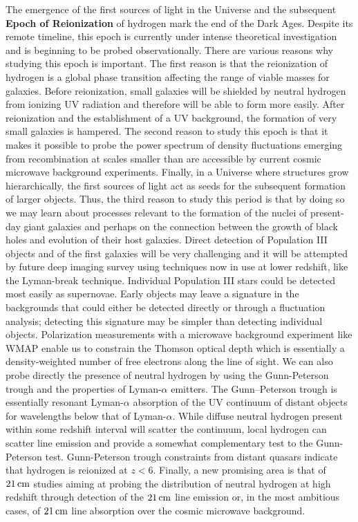 \documentclass[a4paper,11pt]{article}
\begin{document}
The emergence of the first sources of light in the Universe and the subsequent \textbf{Epoch of Reionization} of hydrogen mark the end of the Dark Ages. Despite its remote timeline, this epoch is currently under intense theoretical investigation and is beginning to be probed observationally. There are various reasons why studying this epoch is important. The first reason is that the reionization of hydrogen is a global phase transition affecting the range of viable masses for galaxies. Before reionization, small galaxies will be shielded by neutral hydrogen from ionizing UV radiation and therefore will be able to form more easily. After reionization and the establishment of a UV background, the formation of very small galaxies is hampered. The second reason to study this epoch is that it makes it possible to probe the power spectrum of density fluctuations emerging from recombination at scales smaller than are accessible by current cosmic microwave background experiments. Finally, in a Universe where structures grow hierarchically, the first sources of light act as seeds for the subsequent formation of larger objects. Thus, the third reason to study this period is that by doing so we may learn about processes relevant to the formation of the nuclei of present-day giant galaxies and perhaps on the connection between the growth of black holes and evolution of their host galaxies. Direct detection of Population III objects and of the first galaxies will be very challenging and it will be attempted by future deep imaging survey using techniques now in use at lower redshift, like the Lyman-break technique. Individual Population III stars could be detected most easily as supernovae. Early objects may leave a signature in the backgrounds that could either be detected directly or through a fluctuation analysis; detecting this signature may be simpler than detecting individual objects. Polarization measurements with a microwave background experiment like WMAP enable us to constrain the Thomson optical depth which is essentially a density-weighted number of free electrons along the line of sight. We can also probe directly the presence of neutral hydrogen by using the Gunn-Peterson trough and the properties of Lyman-$\alpha$ emitters. The Gunn–Peterson trough is essentially resonant Lyman-$\alpha$ absorption of the UV continuum of distant objects for wavelengths below that of Lyman-$\alpha$. While diffuse neutral hydrogen present within some redshift interval will scatter the continuum, local hydrogen can scatter line emission and provide a somewhat complementary test to the Gunn-Peterson test. Gunn-Peterson trough constraints from distant quasars indicate that hydrogen is reionized at $z<6$. Finally, a new promising area is that of $21\,{\rm cm}$ studies aiming at probing the distribution of neutral hydrogen at high redshift through detection of the $21\,{\rm cm}$ line emission or, in the most ambitious cases, of $21\,{\rm cm}$ line absorption over the cosmic microwave background.
\end{document}
